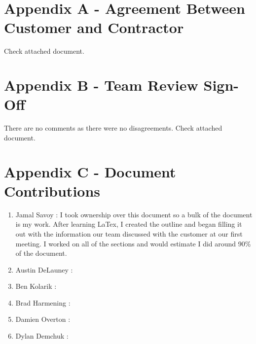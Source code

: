 \documentclass{article}
\begin{document}

\section{Appendix A - Agreement Between Customer and Contractor}\label{sec:apendixA}

\vspace{2.5mm}

\begin{addmargin}[2em]{0em}

Check attached document.

\end{addmargin}

\section{Appendix B - Team Review Sign-Off}\label{sec:appendixB}

\vspace{2.5mm}

\begin{addmargin}[2em]{0em}

There are no comments as there were no disagreements. Check attached document.

\end{addmargin}

\section{Appendix C - Document Contributions}\label{sec:appendixC}

\vspace{2.5mm}

\begin{addmargin}[2em]{0em}

\begin{enumerate}

\item Jamal Savoy : I took ownership over this document so a bulk of the document is my work. After learning LaTex, I created the outline and began filling it out with the information our team discussed with the customer at our first meeting. I worked on all of the sections and would estimate I did around 90\% of the document.

\item Austin DeLauney : 

\item Ben Kolarik : 

\item Brad Harmening : 

\item Damien Overton : 

\item Dylan Demchuk : 

\end{enumerate}
\end{addmargin}
\end{document}
